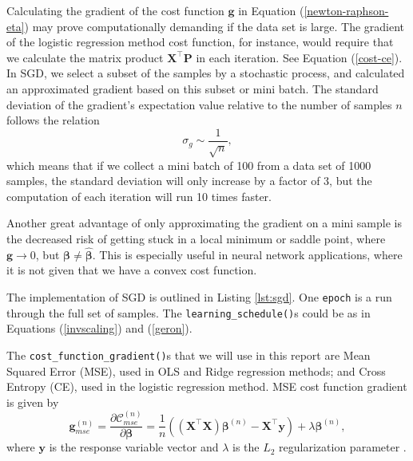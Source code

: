 \documentclass[]{article}
\begin{document}
\vspace{5mm}

Calculating the gradient of the cost function $\mathbf{g}$ in Equation (\ref{newton-raphson-eta}) may prove computationally demanding if the data set is large. The gradient of the logistic regression method cost function, for instance, would require that we calculate the matrix product $\mathbf{X}^\intercal \mathbf{P}$ in each iteration. See Equation (\ref{cost-ce}). In SGD, we select a subset of the samples by a stochastic process, and calculated an approximated gradient based on this subset or mini batch. The standard deviation of the gradient's expectation value relative to the number of samples $n$ follows the relation \cite{fys-stk4155-notes}
\begin{equation}
	\sigma_g \sim \frac{1}{\sqrt{n}},
\end{equation}
which means that if we collect a mini batch of 100 from a data set of 1000 samples, the standard deviation will only increase by a factor of 3, but the computation of each iteration will run 10 times faster.

Another great advantage of only approximating the gradient on a mini sample is the decreased risk of getting stuck in a local minimum or saddle point, where $\mathbf{g} \rightarrow 0$, but $\mathbf{\beta} \neq \mathbf{\hat{\beta}}$. This is especially useful in neural network applications, where it is not given that we have a convex cost function.

The implementation of SGD is outlined in Listing \ref{lst:sgd}. One \lstinline|epoch| is a run through the full set of samples. The \lstinline|learning_schedule()|s could be as in Equations (\ref{invscaling}) and (\ref{geron}). 

\vspace{5mm}

The \lstinline|cost_function_gradient()|s that we will use in this report are Mean Squared Error (MSE), used in OLS and Ridge regression methods; and Cross Entropy (CE), used in the logistic regression method. MSE cost function gradient is given by
\begin{equation} \label{cost-mse}
	\mathbf{g}_{mse}^{(n)} = \frac{\partial \mathcal{C}_{mse}^{(n)}}{\partial \mathbf{\beta}} = \frac{1}{n} ((\mathbf{X}^\intercal \mathbf{X}) \mathbf{\beta}^{(n)} - \mathbf{X}^\intercal \mathbf{y}) + \lambda \mathbf{\beta}^{(n)},
\end{equation}
where $\mathbf{y}$ is the response variable vector and $\lambda$ is the $L_2$ regularization parameter \cite{project1}. 
\end{document}
